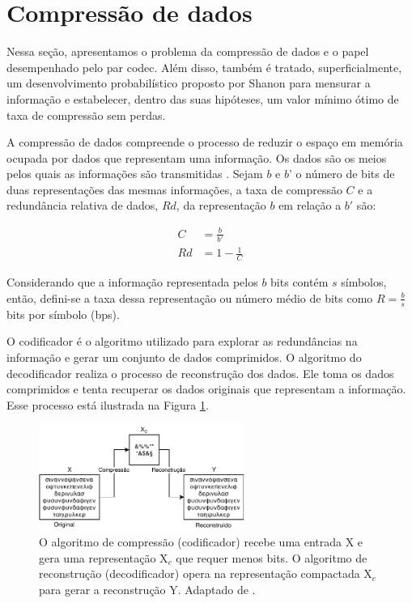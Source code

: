 \section{Compressão de dados}
Nessa seção, apresentamos o problema da compressão de dados e o papel desempenhado pelo par \gls{codec}. Além disso, também é tratado, superficialmente, um desenvolvimento probabilístico proposto por Shanon para mensurar a informação e estabelecer, dentro das suas hipóteses, um valor mínimo ótimo de taxa de compressão sem perdas.

A compressão de dados compreende o processo de reduzir o espaço em memória ocupada por dados que representam uma informação. Os dados são os meios pelos quais as informações são transmitidas \cite{gonzalez2009processamento}. Sejam $b$ e $b’$ o número de bits de duas representações das mesmas informações, a taxa de compressão $C$ e a redundância relativa de dados, $Rd$, da representação $b$ em relação a $b'$ são:

\begin{equation}
\label{eq:compressao}
\begin{aligned}
C &= \frac{b}{b'} \\
Rd &= 1 - \frac{1}{C}
\end{aligned}
\end{equation}

Considerando que a informação representada pelos $b$ bits contém $s$ símbolos, então, defini-se a taxa dessa representação ou número médio de bits como $R = \frac{b}{s}$ bits por símbolo (bps).   

O codificador é o algoritmo utilizado para explorar as redundâncias na informação e gerar um conjunto de dados comprimidos. O algoritmo do decodificador realiza o processo de reconstrução dos dados. Ele toma os dados comprimidos e tenta recuperar os dados originais que representam a informação. Esse processo está ilustrada na Figura \ref{fig:codec}.


\begin{figure}[h]
	\centering
	\includegraphics[width=0.6\textwidth]{figuras/codec.pdf}
	\caption[Compressão e reconstrução sem perdas.]{O algoritmo de compressão (codificador) recebe uma entrada X e gera uma representação X$_c$ que requer menos bits. O algoritmo de reconstrução (decodificador) opera na representação compactada X$_c$ para gerar a reconstrução Y. Adaptado de \cite{sayood2017introduction}.}
	\label{fig:codec}
\end{figure}


